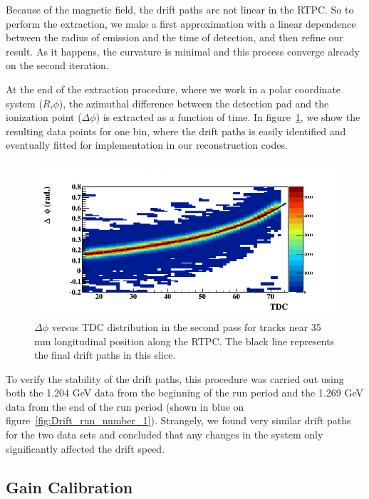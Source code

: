 \documentclass[twocolumn,showpacs,superscriptaddress,groupedaddress]{revtex4}
\begin{document}
Because of the 
magnetic field, the drift paths are not linear in the RTPC. So to perform the extraction, 
we make a first approximation with a linear dependence between the radius of 
emission and the time of detection, and then refine our result. As it happens, 
the curvature is minimal and this process converge already on the second 
iteration. 

At the end of the extraction procedure, where we work in a polar coordinate 
system ($R$,$\phi$), the azimuthal difference between the detection pad and 
the ionization point ($\Delta\phi$) is extracted as a function of time. 
In figure~\ref{fig:DELTA_PHI_TDC}, we show the resulting data points for one 
bin, where the drift paths is easily identified and eventually fitted for 
implementation in our reconstruction codes.

\begin{figure}[tb]
\centering
\includegraphics[scale=0.37]{fig/FitResult_p2_10.png}
\caption{$\Delta \phi$ versus TDC distribution in the second pass for tracks
near 35 mm longitudinal position along the RTPC. The black line represents 
the final drift paths in this slice.}
\label{fig:DELTA_PHI_TDC}
\end{figure}

To verify the stability of the drift paths, this procedure was carried out 
using both the 1.204 GeV data from the beginning of the run period and the 
1.269 GeV data from the end of the run period (shown in blue on 
figure~\ref{fig:Drift_run_number_1}). Strangely, we found very similar drift paths
for the two data sets and concluded that any changes in the system only
significantly affected the drift speed.

\subsection{Gain Calibration}
\end{document}
